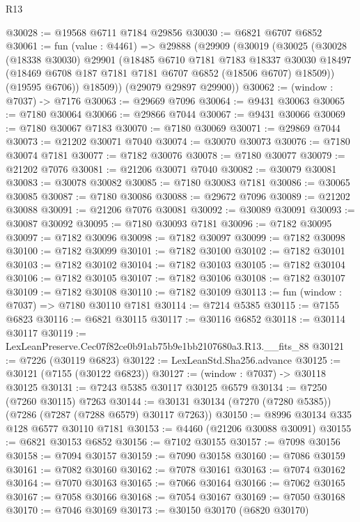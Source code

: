 \begin{lexlean}{R13}
\begin{coremodule}
@30028 := @19568 @6711 @7184 @29856
@30030 := @6821 @6707 @6852
@30061 := fun (value : @4461) =>
  @29888
    (@29909
      (@30019
        (@30025
          (@30028
            (@18338 @30030)
            @29901
            (@18485
              @6710
              @7181
              @7183
              @18337
              @30030
              @18497
              (@18469 @6708 @187 @7181 @7181 @6707 @6852 (@18506 @6707) @18509))
            (@19595 @6706))
          @18509))
      (@29079 @29897 @29900))
@30062 := (window : @7037) -> @7176
@30063 := @29669 @7096
@30064 := @9431 @30063
@30065 := @7180 @30064
@30066 := @29866 @7044
@30067 := @9431 @30066
@30069 := @7180 @30067 @7183
@30070 := @7180 @30069
@30071 := @29869 @7044
@30073 := @21202 @30071 @7040
@30074 := @30070 @30073
@30076 := @7180 @30074 @7181
@30077 := @7182 @30076
@30078 := @7180 @30077
@30079 := @21202 @7076
@30081 := @21206 @30071 @7040
@30082 := @30079 @30081
@30083 := @30078 @30082
@30085 := @7180 @30083 @7181
@30086 := @30065 @30085
@30087 := @7180 @30086
@30088 := @29672 @7096
@30089 := @21202 @30088
@30091 := @21206 @7076 @30081
@30092 := @30089 @30091
@30093 := @30087 @30092
@30095 := @7180 @30093 @7181
@30096 := @7182 @30095
@30097 := @7182 @30096
@30098 := @7182 @30097
@30099 := @7182 @30098
@30100 := @7182 @30099
@30101 := @7182 @30100
@30102 := @7182 @30101
@30103 := @7182 @30102
@30104 := @7182 @30103
@30105 := @7182 @30104
@30106 := @7182 @30105
@30107 := @7182 @30106
@30108 := @7182 @30107
@30109 := @7182 @30108
@30110 := @7182 @30109
@30113 := fun (window : @7037) => @7180 @30110 @7181
@30114 := @7214 @5385
@30115 := @7155 @6823
@30116 := @6821 @30115
@30117 := @30116 @6852
@30118 := @30114 @30117
@30119 := LexLeanPreserve.Cec07f82ce0b91ab75b9e1bb2107680a3.R13.__fits_88
@30121 := @7226 (@30119 @6823)
@30122 := LexLeanStd.Sha256.advance
@30125 := @30121 (@7155 (@30122 @6823))
@30127 := (window : @7037) -> @30118 @30125
@30131 := @7243 @5385 @30117 @30125 @6579
@30134 := @7250 (@7260 @30115) @7263
@30144 := @30131 @30134 (@7270 (@7280 @5385)) (@7286 (@7287 (@7288 @6579) @30117 @7263))
@30150 := @8996 @30134 @335 @128 @6577 @30110 @7181
@30153 := @4460 (@21206 @30088 @30091)
@30155 := @6821 @30153 @6852
@30156 := @7102 @30155
@30157 := @7098 @30156
@30158 := @7094 @30157
@30159 := @7090 @30158
@30160 := @7086 @30159
@30161 := @7082 @30160
@30162 := @7078 @30161
@30163 := @7074 @30162
@30164 := @7070 @30163
@30165 := @7066 @30164
@30166 := @7062 @30165
@30167 := @7058 @30166
@30168 := @7054 @30167
@30169 := @7050 @30168
@30170 := @7046 @30169
@30173 := @30150 @30170 (@6820 @30170)

\end{coremodule}
\end{lexlean}
